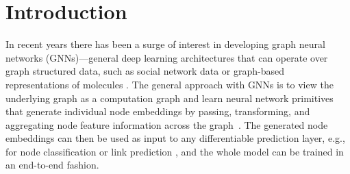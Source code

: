 \section{Introduction}
\label{sec:intro}
In recent years there has been a surge of interest in developing graph neural networks (GNNs)---general deep learning architectures that can operate over graph structured data, such as social network data \cite{hamilton2017inductive,kipf2017semi,Vel+2018} or graph-based representations of molecules \cite{dai2016discriminative,Duv+2015,Gil+2017}.
The general approach with GNNs is to view the underlying graph as a computation graph and learn neural network primitives that generate individual node embeddings by passing, transforming, and aggregating node feature information across the graph~\cite{Gil+2017,hamilton2017inductive}.
%
The generated node embeddings can then be used as input to any differentiable prediction layer, e.g., for node classification \cite{hamilton2017inductive} or link prediction \cite{Sch+2017}, and the whole model can be trained in an end-to-end fashion. 


